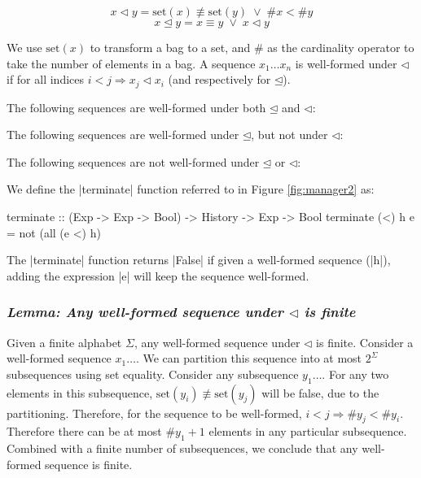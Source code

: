 \documentclass[draft]{sigplanconf}
\newcommand{\lemma}[1]{\subsubsection*{\textit{Lemma: #1}}}
\newcommand{\set}{\mathrm{set}}
\newcommand{\veeskip}{\;\vee\;}
\begin{document}
\[
x \lhd y = \set(x) \not\equiv \set(y)  \veeskip \# x < \# y
\]
\[
x \unlhd y = x \equiv y \veeskip x \lhd y
\]

We use $\set(x)$ to transform a bag to a set, and $\#$ as the cardinality operator to take the number of elements in a bag. A sequence $x_1 \ldots x_n$ is well-formed under $\lhd$ if for all indices $i < j \Rightarrow x_j \lhd x_i$ (and respectively for $\unlhd$).

The following sequences are well-formed under both $\unlhd$ and $\lhd$:

\begin{code}
\end{code}

The following sequences are well-formed under $\unlhd$, but not under $\lhd$:

\begin{code}
\end{code}

The following sequences are not well-formed under $\unlhd$ or $\lhd$:

\begin{code}
\end{code}

We define the |terminate| function referred to in Figure \ref{fig:manager2} as:

\begin{code}
terminate  :: (Exp -> Exp -> Bool) -> History -> Exp -> Bool
terminate (<) h e = not (all (e <) h)
\end{code}

The |terminate| function returns |False| if given a well-formed sequence (|h|), adding the expression |e| will keep the sequence well-formed.

\lemma{Any well-formed sequence under $\lhd$ is finite}

Given a finite alphabet $\Sigma$, any well-formed sequence under $\lhd$ is finite. Consider a well-formed sequence $x_1\ldots$. We can partition this sequence into at most $2^\Sigma$ subsequences using set equality. Consider any subsequence $y_1\ldots$. For any two elements in this subsequence, $\set(y_i) \not\equiv \set(y_j)$ will be false, due to the partitioning. Therefore, for the sequence to be well-formed, $i < j \Rightarrow \# y_j < \# y_i$. Therefore there can be at most $\#y_1+1$ elements in any particular subsequence. Combined with a finite number of subsequences, we conclude that any well-formed sequence is finite.
\end{document}
